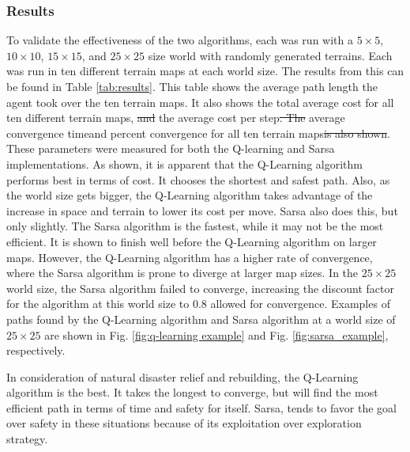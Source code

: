 \documentclass[12pt,american]{report}
\providecommand{\DIFaddtex}[1]{{\protect\color{blue}\uwave{#1}}} %
\providecommand{\DIFdeltex}[1]{{\protect\color{red}\sout{#1}}}                      %
\providecommand{\DIFaddbegin}{} %
\providecommand{\DIFaddend}{} %
\providecommand{\DIFdelbegin}{} %
\providecommand{\DIFdelend}{} %
\providecommand{\DIFadd}[1]{\texorpdfstring{\DIFaddtex{#1}}{#1}} %
\providecommand{\DIFdel}[1]{\texorpdfstring{\DIFdeltex{#1}}{}} %
\newcommand{\DIFscaledelfig}{0.5}
\newlength{\DIFdelgraphicswidth} %
\newlength{\DIFdelgraphicsheight} %
\newcommand{\DIFaddincludegraphics}[2][]{{\color{blue}\fbox{\DIFOincludegraphics[#1]{#2}}}} %
\newcommand{\DIFdelincludegraphics}[2][]{%
\sbox{\DIFdelgraphicsbox}{\DIFOincludegraphics[#1]{#2}}%
\settoboxwidth{\DIFdelgraphicswidth}{\DIFdelgraphicsbox} %
\settoboxtotalheight{\DIFdelgraphicsheight}{\DIFdelgraphicsbox} %
\scalebox{\DIFscaledelfig}{%
\parbox[b]{\DIFdelgraphicswidth}{\usebox{\DIFdelgraphicsbox}\\[-\baselineskip] \rule{\DIFdelgraphicswidth}{0em}}\llap{\resizebox{\DIFdelgraphicswidth}{\DIFdelgraphicsheight}{%
\setlength{\unitlength}{\DIFdelgraphicswidth}%
\begin{picture}(1,1)%
\thicklines\linethickness{2pt} %
{\color[rgb]{1,0,0}\put(0,0){\framebox(1,1){}}}%
{\color[rgb]{1,0,0}\put(0,0){\line( 1,1){1}}}%
{\color[rgb]{1,0,0}\put(0,1){\line(1,-1){1}}}%
\end{picture}%
}\hspace*{3pt}}} %
} %
\DeclareRobustCommand{\DIFaddbegin}{\DIFOaddbegin \let\includegraphics\DIFaddincludegraphics} %
\DeclareRobustCommand{\DIFaddend}{\DIFOaddend \let\includegraphics\DIFOincludegraphics} %
\DeclareRobustCommand{\DIFdelbegin}{\DIFOdelbegin \let\includegraphics\DIFdelincludegraphics} %
\DeclareRobustCommand{\DIFdelend}{\DIFOaddend \let\includegraphics\DIFOincludegraphics} %
\begin{document}
\subsubsection{Results}

To validate the effectiveness of the two algorithms, each was run with a $5\times  5$, $10\times  10$, $15\times  15$, and $25\times  25$ size world with randomly generated terrains.  Each was run in ten different terrain maps at each world size.  The results from this can be found in Table \ref{tab:results}. This table shows the average path length the agent took over the ten terrain maps. It also shows the total average cost for all ten different terrain maps, \DIFdelbegin \DIFdel{and }\DIFdelend the average cost per step\DIFdelbegin \DIFdel{. The }\DIFdelend \DIFaddbegin \DIFadd{, the }\DIFaddend average convergence time\DIFaddbegin \DIFadd{, }\DIFaddend and percent convergence for all ten terrain maps\DIFdelbegin \DIFdel{is also shown}\DIFdelend . These parameters were measured for both the Q-learning and Sarsa implementations.  As shown, it is apparent that the Q-Learning algorithm performs best in terms of cost.  It chooses the shortest and safest path. Also, as the world size gets bigger, the Q-Learning algorithm takes advantage of the increase in space and terrain to lower its cost per move. Sarsa also does this, but only slightly.  The Sarsa algorithm is the fastest, while it may not be the most efficient.  It is shown to finish well before the Q-Learning algorithm on larger maps.  However, the Q-Learning algorithm has a higher rate of convergence, where the Sarsa algorithm is prone to diverge at larger map sizes.  In the $25\times  25$ world size, the Sarsa algorithm failed to converge, increasing the discount factor for the algorithm at this world size to 0.8 allowed for convergence. Examples of paths found by the Q-Learning algorithm and Sarsa algorithm at a world size of $25\times  25$ are shown in Fig. \ref{fig:q-learning example} and Fig. \ref{fig:sarsa_example}, respectively.

In consideration of natural disaster relief and rebuilding, the Q-Learning algorithm is the best.  It takes the longest to converge, but will find the most efficient path in terms of time and safety for itself.  Sarsa, tends to favor the goal over safety in these situations because of its exploitation over exploration strategy. 
\end{document}
